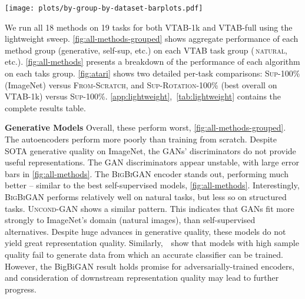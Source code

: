 \documentclass{article}
\newcommand{\myparagraph}[1]{\noindent\textbf{#1}\quad}
\DeclareRobustCommand{\taskNatural}{\raisebox{0.5pt}{\tikz{\fill[natural] (0cm,0cm) circle (.5ex);}}\,\textsc{natural}}
\newcommand{\imagenet}{ImageNet}
\begin{document}
\begin{SCfigure*}[][t]
  \texttt{[image: plots/by-group-by-dataset-barplots.pdf]}\\
  \vspace{-15pt}
  \caption{
  The methods are divided into five groups:
  Generative,
  training from-scratch,
  all methods using  labels (Semi Supervised),
  and all methods using  labels (Supervised),
  For each task group, bars show the mean accuracy across all methods with 3 repeats.
  Error bars indicate standard deviation across methods.
  The BigBiGAN outlier causes the high variance in generative models.
  \vspace{-15pt}
  }
  \label{fig:all-methods-grouped}
\end{SCfigure*}


We run all 18 methods on 19 tasks for both VTAB-1k and VTAB-full using the lightweight sweep.
\cref{fig:all-methods-grouped} shows aggregate performance of each method group (generative, self-sup, etc.) on each VTAB task group (\taskNatural{}, etc.).
\cref{fig:all-methods} presents a breakdown of the performance of each algorithm on each taks group.
\cref{fig:atari} shows two detailed per-task comparisons:
\textsc{Sup-100\%} (\imagenet{}) versus \textsc{From-Scratch}, and
\textsc{Sup-Rotation-100\%} (best overall on VTAB-1k) versus \textsc{Sup-100\%}.
\cref{app:lightweight},~\cref{tab:lightweight} contains the complete results table.

\myparagraph{Generative Models}
Overall, these perform worst, \cref{fig:all-methods-grouped}.
The autoencoders perform more poorly than training from scratch.
Despite SOTA generative quality on \imagenet{}, the GANs' discriminators do not provide useful representations.
The GAN discriminators appear unstable, with large error bars in \cref{fig:all-methods}.
The \textsc{BigBiGAN} encoder stands out, performing much better -- similar to the best self-supervised models, \cref{fig:all-methods}.
Interestingly, \textsc{BigBiGAN} performs relatively well on natural tasks, but less so on structured tasks.
\textsc{Uncond-GAN} shows a similar pattern.
This indicates that GANs fit more strongly to \imagenet's domain (natural images), than self-supervised alternatives.
Despite huge advances in generative quality, these models do not yield great representation quality.
Similarly,~\citet{ravuri2019classification}~show that models with high sample quality fail to generate data from which an accurate classifier can be trained.
However, the BigBiGAN result holds promise for adversarially-trained encoders, and consideration of downstream representation quality may lead to further progress.
\end{document}
